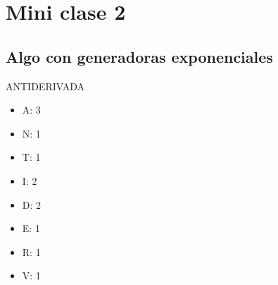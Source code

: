 \documentclass[../main.tex]{subfiles}
\begin{document}
\chapter{Mini clase 2}%

\thispagestyle{fancy}

\section{Algo con generadoras exponenciales}%
\label{sec:algo_con_generadoras_exponenciales}

{
	\centering
	\Huge
	ANTIDERIVADA

}
\begin{itemize}
	\item A: 3
	\item N: 1
	\item T: 1
	\item I: 2
	\item D: 2
	\item E: 1
	\item R: 1
	\item V: 1
\end{itemize}
\end{document}
